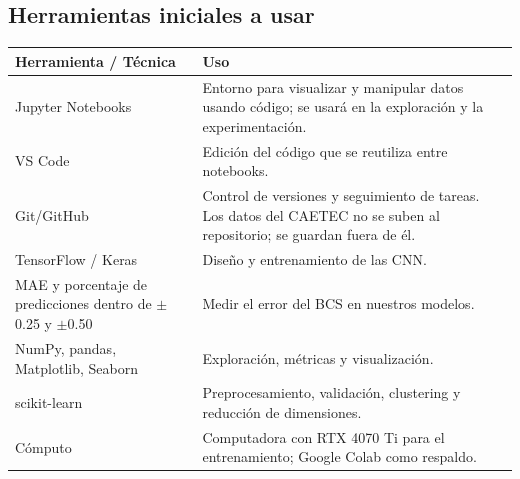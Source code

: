 \subsection{Herramientas iniciales a usar}

\noindent
\begin{tabularx}{\textwidth}{>{\raggedright\arraybackslash}p{}>{\raggedright\arraybackslash}X}
  \toprule
  Herramienta / Técnica & Uso \\
  \midrule
  Jupyter Notebooks & Entorno para visualizar y manipular datos usando código; se usará en la exploración y la experimentación. \\
  \addlinespace
  VS Code & Edición del código que se reutiliza entre notebooks. \\
  \addlinespace
  Git/GitHub & Control de versiones y seguimiento de tareas. Los datos del CAETEC no se suben al repositorio; se guardan fuera de él. \\
  \addlinespace
  TensorFlow / Keras & Diseño y entrenamiento de las CNN. \\
  \addlinespace
  MAE y porcentaje de predicciones dentro de $\pm$0.25 y $\pm$0.50 & Medir el error del BCS en nuestros modelos. \\
  \addlinespace
  NumPy, pandas, Matplotlib, Seaborn & Exploración, métricas y visualización. \\
  \addlinespace
  scikit-learn & Preprocesamiento, validación, clustering y reducción de dimensiones. \\
  \addlinespace
  Cómputo & Computadora con RTX 4070 Ti para el entrenamiento; Google Colab como respaldo. \\
  \bottomrule
\end{tabularx}
